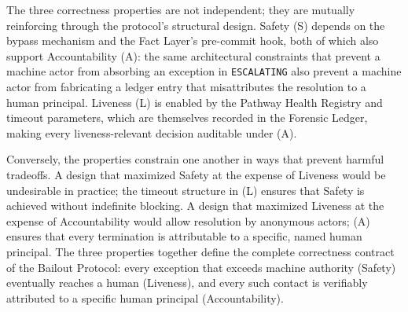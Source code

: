The three correctness properties are not independent; they are mutually reinforcing through the protocol's structural design. Safety (S) depends on the bypass mechanism and the Fact Layer's pre-commit hook, both of which also support Accountability (A): the same architectural constraints that prevent a machine actor from absorbing an exception in \texttt{ESCALATING} also prevent a machine actor from fabricating a ledger entry that misattributes the resolution to a human principal. Liveness (L) is enabled by the Pathway Health Registry and timeout parameters, which are themselves recorded in the Forensic Ledger, making every liveness-relevant decision auditable under (A).

Conversely, the properties constrain one another in ways that prevent harmful tradeoffs. A design that maximized Safety at the expense of Liveness would be undesirable in practice; the timeout structure in (L) ensures that Safety is achieved without indefinite blocking. A design that maximized Liveness at the expense of Accountability would allow resolution by anonymous actors; (A) ensures that every termination is attributable to a specific, named human principal. The three properties together define the complete correctness contract of the Bailout Protocol: every exception that exceeds machine authority (Safety) eventually reaches a human (Liveness), and every such contact is verifiably attributed to a specific human principal (Accountability).